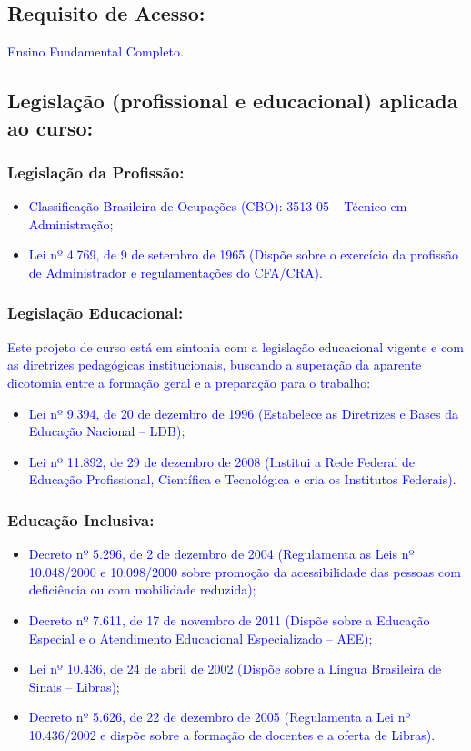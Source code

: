 \documentclass{../../modelos/latex-shared/ifsc-ppc}
\newcommand{\revisao}[1]{\textcolor{blue}{#1}}
\newcommand{\revisao}[1]{#1}
\begin{document}
\subsection{Requisito de Acesso:}
\revisao{Ensino Fundamental Completo.}

\subsection{Legislação (profissional e educacional) aplicada ao curso:}

\subsubsection{Legislação da Profissão:}
\begin{itemize}
    \item \revisao{Classificação Brasileira de Ocupações (CBO): 3513-05 -- Técnico em Administração;}
    \item \revisao{Lei nº 4.769, de 9 de setembro de 1965 (Dispõe sobre o exercício da profissão de Administrador e regulamentações do CFA/CRA).}
\end{itemize}

\subsubsection{Legislação Educacional:}
\revisao{Este projeto de curso está em sintonia com a legislação educacional vigente e com as diretrizes pedagógicas institucionais, buscando a superação da aparente dicotomia entre a formação geral e a preparação para o trabalho:}
\begin{itemize}
    \item \revisao{Lei nº 9.394, de 20 de dezembro de 1996 (Estabelece as Diretrizes e Bases da Educação Nacional -- LDB);}
    \item \revisao{Lei nº 11.892, de 29 de dezembro de 2008 (Institui a Rede Federal de Educação Profissional, Científica e Tecnológica e cria os Institutos Federais).}
\end{itemize}

\subsubsection{Educação Inclusiva:}
\begin{itemize}
    \item \revisao{Decreto nº 5.296, de 2 de dezembro de 2004 (Regulamenta as Leis nº 10.048/2000 e 10.098/2000 sobre promoção da acessibilidade das pessoas com deficiência ou com mobilidade reduzida);}
    \item \revisao{Decreto nº 7.611, de 17 de novembro de 2011 (Dispõe sobre a Educação Especial e o Atendimento Educacional Especializado -- AEE);}
    \item \revisao{Lei nº 10.436, de 24 de abril de 2002 (Dispõe sobre a Língua Brasileira de Sinais -- Libras);}
    \item \revisao{Decreto nº 5.626, de 22 de dezembro de 2005 (Regulamenta a Lei nº 10.436/2002 e dispõe sobre a formação de docentes e a oferta de Libras).}
\end{itemize}
\end{document}
